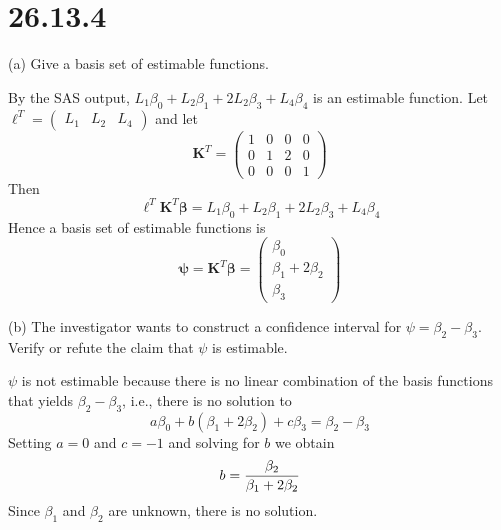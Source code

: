 \section*{26.13.4}
(a) Give a basis set of estimable functions.

\bigskip
\noindent
By the SAS output, $L_1\beta_0+L_2\beta_1+2L_2\beta_3+L_4\beta_4$
is an estimable function.
Let $\bm\ell^T=\begin{pmatrix} L_1 & L_2 & L_4\end{pmatrix}$ and let
\[
\mathbf K^T=
\begin{pmatrix}
1 & 0 & 0 & 0\\
0 & 1 & 2 & 0\\
0 & 0 & 0 & 1
\end{pmatrix}
\]
Then
\[
\bm\ell^T\mathbf K^T\bm\beta=L_1\beta_0+L_2\beta_1+2L_2\beta_3+L_4\beta_4
\]
Hence a basis set of estimable functions is
\[
\bm\psi=\mathbf K^T\bm\beta=
\begin{pmatrix}
\beta_0\\
\beta_1+2\beta_2\\
\beta_3
\end{pmatrix}
\]

\bigskip
\noindent
(b) The investigator wants to construct a confidence interval for
$\psi=\beta_2-\beta_3$.
Verify or refute the claim that $\psi$ is estimable.

\bigskip
\noindent
$\psi$ is not estimable because there is no linear combination
of the basis functions that yields $\beta_2-\beta_3$, i.e., there
is no solution to
\[
a\beta_0+b(\beta_1+2\beta_2)+c\beta_3=\beta_2-\beta_3
\]
Setting $a=0$ and $c=-1$ and solving for $b$ we obtain
\[
b={\beta_2\over\beta_1+2\beta_2}
\]
Since $\beta_1$ and $\beta_2$ are unknown, there is no solution.
